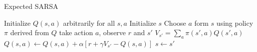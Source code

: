 \documentclass[a4paper]{article}
\begin{document}
\begin{itemize}
\begin{equation*}
    \end{equation*}
    \begin{algorithm}[H]
        \caption{Expected SARSA}
        \begin{algorithmic}[1]
            \State Initialize $Q(s,a)$ arbitrarily for all $s,a$
                \State Initialize $s$
                    \State Choose $a$ form $s$ using policy $\pi$ derived from $Q$
                    \State take action $a$, observe $r$ and $s'$
                    \State $V_{s'}=\sum_a\pi(s',a)Q(s',a)$
                    \State $Q(s,a)\gets Q(s,a)+\alpha[r+\gamma V_{s'}-Q(s,a)]$
                    \State $s\gets s'$
                \EndFor
            \EndFor
        \end{algorithmic}
    \end{algorithm}
\end{itemize}
\end{document}
